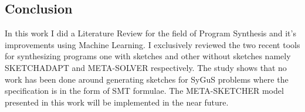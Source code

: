 \subsection{Conclusion}
In this work I did a Literature Review for the field of Program Synthesis and it's improvements using Machine Learning. I exclusively reviewed the two recent tools for synthesizing programs one with sketches and other without sketches namely SKETCHADAPT and META-SOLVER respectively. The study shows that no work has been done around generating sketches for SyGuS problems where the specification is in the form of SMT formulae. The META-SKETCHER model presented in this work will be implemented in the near future.










